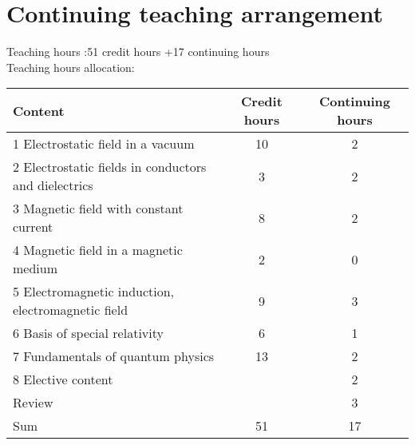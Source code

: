 \documentclass[10pt,a4paper,oneside]{article}
\begin{document}
\section{Continuing teaching arrangement}
Teaching hours :51 credit hours +17 continuing hours\\
Teaching hours allocation:\\
\begin{center}
\begin{tabular}{|l|c|c|} %
	\hline 
	Content&Credit hours&Continuing hours\\
	\hline  
	1 Electrostatic field in a vacuum&10&2\\
	\hline 
	2 Electrostatic fields in conductors and dielectrics&3&2\\
	\hline 
	3 Magnetic field with constant current&8&2\\
	\hline 
	4 Magnetic field in a magnetic medium&2&0\\
	\hline 
	5 Electromagnetic induction, electromagnetic field&9&3\\
	\hline 
	6 Basis of special relativity&6&1\\
	\hline 
	7 Fundamentals of quantum physics&13&2\\
	\hline 
	8 Elective content&&2\\
	\hline 
	Review&&3\\
	\hline 
	Sum&51&17\\
	\hline 
\end{tabular}
\end{center}
\end{document}
